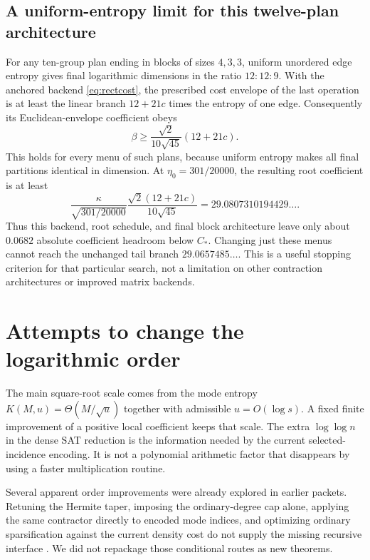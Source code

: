 \subsection{A uniform-entropy limit for this twelve-plan architecture}

For any ten-group plan ending in blocks of sizes \(4,3,3\), uniform
unordered edge entropy gives final logarithmic dimensions in the ratio
\(12:12:9\). With the anchored backend \eqref{eq:rectcost}, the prescribed
cost envelope of the last operation is at least the linear branch \(12+21c\)
times the entropy of one edge.
Consequently its Euclidean-envelope coefficient obeys
\begin{equation}\label{eq:uniformlower}
 \beta\ge\frac{\sqrt2}{10\sqrt{45}}(12+21c).
\end{equation}
This holds for every menu of such plans, because uniform entropy makes
all final partitions identical in dimension.
At \(\eta_0=301/20000\), the resulting root coefficient is at least
\[
 \frac{\kappa}{\sqrt{301/20000}}
 \frac{\sqrt2(12+21c)}{10\sqrt{45}}
 =29.0807310194429\ldots.
\]
Thus this backend, root schedule, and final block architecture leave only
about \(0.0682\) absolute coefficient headroom below \(C_*\).
Changing just these menus cannot reach the unchanged tail branch
\(29.0657485\ldots\).
This is a useful stopping criterion for that particular search, not a
limitation on other contraction architectures or improved matrix backends.

\section{Attempts to change the logarithmic order}\label{sec:order}

The main square-root scale comes from the mode entropy
\(K(M,u)=\Theta(M/\sqrt u)\) together with admissible
\(u=O(\log s)\). A fixed finite improvement of a positive local coefficient
keeps that scale. The extra \(\log\log n\) in the dense SAT reduction is
the information needed by the current selected-incidence encoding.
It is not a polynomial arithmetic factor that disappears by using a
faster multiplication routine.

Several apparent order improvements were already explored in earlier
packets. Retuning the Hermite taper, imposing the ordinary-degree cap
alone, applying the same contractor directly to encoded mode indices,
and optimizing ordinary sparsification against the current density cost
do not supply the missing recursive interface \cite{barriers,precision}.
We did not repackage those conditional routes as new theorems.

